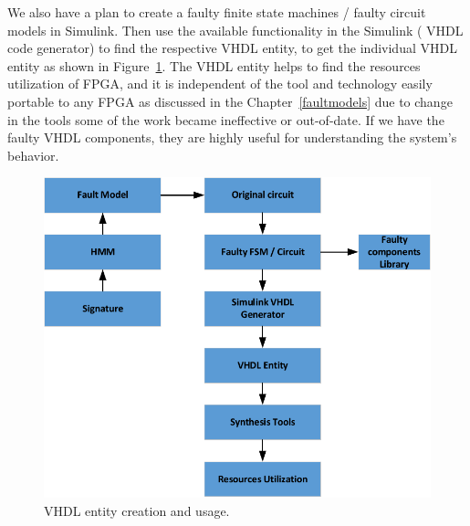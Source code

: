 We also have a plan to create a faulty finite state machines / faulty circuit models in Simulink. Then use the available functionality in the Simulink ( VHDL code generator) to find the respective VHDL entity, to get the individual VHDL entity as shown in Figure~\ref{fig:library1}. The VHDL entity helps to find the resources utilization of FPGA, and it is independent of the tool and technology easily portable to any FPGA as discussed in the Chapter~\ref{faultmodels} due to change in the tools some of the work became ineffective or out-of-date. If we have the faulty VHDL components, they are highly useful for understanding the system's behavior.
%
%
\begin{figure}[tb!]
 \centering
  \captionsetup{justification=centering}    
   \includegraphics[scale=0.8]{Figures/library.pdf}
   \caption{VHDL entity creation and usage.}
\label{fig:library1}
\end{figure}

